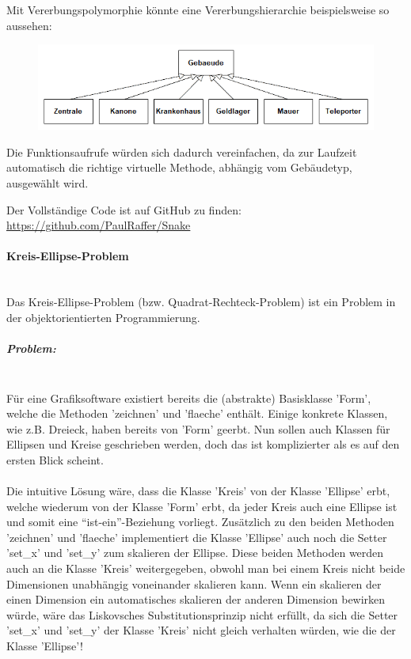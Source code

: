 				Mit Vererbungspolymorphie könnte eine Vererbungshierarchie beispielsweise so aussehen:
				\begin{figure}[H]
					\includegraphics[width=\textwidth]{polymorphie/universell/vererbung/beispiele/snake/gebaeude.png}
				\end{figure}
				
				Die Funktionsaufrufe würden sich dadurch vereinfachen, da zur Laufzeit automatisch die richtige virtuelle
				Methode, abhängig vom Gebäudetyp, ausgewählt wird.
				\UseRawInputEncoding{}
				
				Der Vollständige Code ist auf GitHub zu finden: \url{https://github.com/PaulRaffer/Snake}
				
			\paragraph{Kreis-Ellipse-Problem}\mbox{}\\
				Das Kreis-Ellipse-Problem (bzw. Quadrat-Rechteck-Problem) ist ein Problem in der objektorientierten
				Programmierung.
				
				\subparagraph*{Problem:}\mbox{}\\
					Für eine Grafiksoftware existiert bereits die (abstrakte) Basisklasse 'Form', welche die Methoden
					'zeichnen' und 'flaeche' enthält. Einige konkrete Klassen, wie z.B. Dreieck, haben bereits von 'Form'
					geerbt. Nun sollen auch Klassen für Ellipsen und Kreise geschrieben werden, doch das ist komplizierter
					als es auf den ersten Blick scheint.
					\\\\
					Die intuitive Lösung wäre, dass die Klasse 'Kreis' von der Klasse 'Ellipse' erbt, welche wiederum von
					der Klasse 'Form' erbt, da jeder Kreis auch eine Ellipse ist und somit eine ``ist-ein''-Beziehung
					vorliegt. Zusätzlich zu den beiden Methoden 'zeichnen' und 'flaeche' implementiert die Klasse 'Ellipse'
					auch noch die Setter 'set\_x' und 'set\_y' zum skalieren der Ellipse. Diese beiden Methoden werden auch
					an die Klasse 'Kreis' weitergegeben, obwohl man bei einem Kreis nicht beide Dimensionen unabhängig
					voneinander skalieren kann. Wenn ein skalieren der einen Dimension ein automatisches skalieren der anderen
					Dimension bewirken würde, wäre das Liskovsches Substitutionsprinzip nicht erfüllt, da sich die Setter
					'set\_x' und 'set\_y' der Klasse 'Kreis' nicht gleich verhalten würden, wie die der Klasse 'Ellipse'!
					
